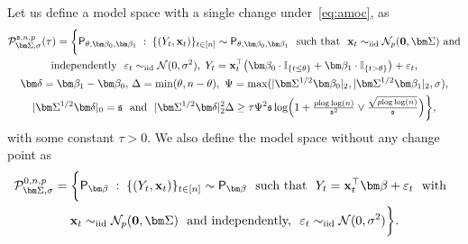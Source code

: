 \documentclass[11pt, a4paper]{article}
\newcommand{\mbf}{\mathbf}
\newcommand{\mc}{\mathcal}
\newcommand{\vep}{\varepsilon}
\newcommand{\cp}{\theta}
\newcommand{\p}{\mathsf{P}}
\newcommand{\iid}{\text{\upshape iid}}
\theoremstyle{definition}
\theoremstyle{definition}
\theoremstyle{definition}
\theoremstyle{definition}
\theoremstyle{definition}
\theoremstyle{remark}
\theoremstyle{definition}
\theoremstyle{definition}
\theoremstyle{definition}
\begin{document}
Let us define a model space with a single change under~\eqref{eq:amoc}, as
\begin{multline*}
\mc P_{\bm\Sigma, \sigma}^{\mathfrak{s}, n, p}(\tau) = \biggl\{ \p_{\cp, \bm\beta_0, \bm\beta_1} \;:\; \{(Y_t, \mbf x_t)\}_{t \in [n]} \sim \p_{\cp, \bm\beta_0, \bm\beta_1} \text{ \ such that \ } \mbf x_t \sim_{\iid} \mc N_p(\mbf 0, \bm\Sigma) \text{ and}\\
\text{independently \ }  \vep_t \sim_{\iid}\mc N (0,\sigma^2), \; 
Y_t = \mbf x_t^\top \bigl( \bm\beta_0 \cdot \mathbb{I}_{\{t \le \cp\}} + \bm\beta_1 \cdot \mathbb{I}_{\{t > \cp\}} \bigr) + \vep_t,
\\
\bm\delta = \bm\beta_1 - \bm\beta_0, \,
\Delta = \min(\cp, n - \cp), \,
 \, \Psi = \max(\vert \bm\Sigma^{1/2} \bm\beta_0 \vert_2, \vert \bm\Sigma^{1/2} \bm\beta_1 \vert_2, \sigma), 
\\
\vert \bm\Sigma^{1/2} \bm\delta\vert_0 = \mathfrak{s}
\text{ \ and \ } \vert \bm\Sigma^{1/2}\bm\delta\vert_2^2 \Delta \ge \tau \Psi^2\mathfrak{s} \log\Bigl(1 + \tfrac{p {\log\log(n)}}{\mathfrak{s}^2}\vee\tfrac{\sqrt{p {\log\log(n)}}}{\mathfrak{s}}\Bigr)\biggr\},
\end{multline*} 
with some constant $\tau > 0$. We also define the model space without any change point as 
\begin{multline*}
\mc P_{\bm\Sigma, \sigma}^{0, n, p} = \biggl\{\p_{\bm\beta} \;:\; \{(Y_t, \mbf x_t)\}_{t \in [n]} \sim \p_{\bm\beta} \text{ \ such that \ } Y_t = \mbf x_t^\top \bm\beta + \vep_t  \text{ \ with \ }\\ \mbf x_t \sim_{\iid} \mc N_p(\mbf 0, \bm\Sigma)
 \text{ \  and independently, \ } \vep_t \sim_{\iid}\mc N (0,\sigma^2) 
 \biggr\}.
\end{multline*}
\end{document}
